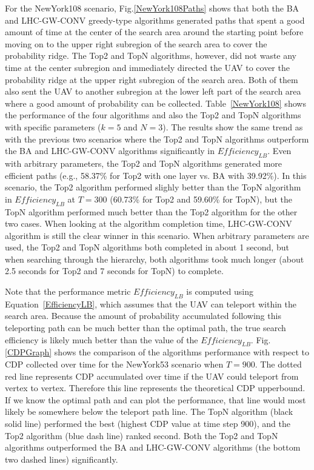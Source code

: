 \documentclass[journal]{IEEEtran}
\begin{document}
For the NewYork108 scenario, Fig.\ref{NewYork108Paths} shows that both the BA and LHC-GW-CONV greedy-type algorithms generated paths that spent a good amount of time at the center of the search area around the starting point before moving on to the upper right subregion of the search area to cover the probability ridge. The Top2 and TopN algorithms, however, did not waste any time at the center subregion and immediately directed the UAV to cover the probability ridge at the upper right subregion of the search area. Both of them also sent the UAV to another subregion at the lower left part of the search area where a good amount of probability can be collected. Table~\ref{NewYork108} shows the performance of the four algorithms and also the Top2 and TopN algorithms with specific parameters ($k=5$ and $N=3$). The results show the same trend as with the previous two scenarios where the Top2 and TopN algorithms outperform the BA and LHC-GW-CONV algorithms significantly in $\mathit{Efficiency_{LB}}$. Even with arbitrary parameters, the Top2 and TopN algorithms generated more efficient paths (e.g., 58.37\% for Top2 with one layer vs. BA with 39.92\%). In this scenario, the Top2 algorithm performed slighly better than the TopN algorithm in $\mathit{Efficiency_{LB}}$ at $T=300$ (60.73\% for Top2 and 59.60\% for TopN), but the TopN algorithm performed much better than the Top2 algorithm for the other two cases. When looking at the algorithm completion time, LHC-GW-CONV algorithm is still the clear winner in this scenario. When arbitrary parameters are used, the Top2 and TopN algorithms both completed in about 1 second, but when searching through the hierarchy, both algorithms took much longer (about 2.5 seconds for Top2 and 7 seconds for TopN) to complete.


Note that the performance metric $\mathit{Efficiency_{LB}}$ is computed using Equation~\ref{EfficiencyLB}, which assumes that the UAV can teleport within the search area. Because the amount of probability accumulated following this teleporting path can be much better than the optimal path, the true search efficiency is likely much better than the value of the $\mathit{Efficiency_{LB}}$. Fig.\ref{CDPGraph} shows the comparison of the algorithms performance with respect to CDP collected over time for the NewYork53 scenario when $T=900$. The dotted red line represents CDP accumulated over time if the UAV could teleport from vertex to vertex. Therefore this line represents the theoretical CDP upperbound. If we know the optimal path and can plot the performance, that line would most likely be somewhere below the teleport path line. The TopN algorithm (black solid line) performed the best (highest CDP value at time step 900), and the Top2 algorithm (blue dash line) ranked second. Both the Top2 and TopN algorithms outperformed the BA and LHC-GW-CONV algorithms (the bottom two dashed lines) significantly.
\end{document}
